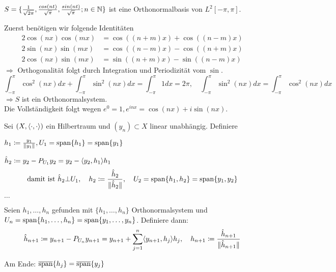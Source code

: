 \begin{beispiel}
	$S = \{ \frac{1}{\sqrt{2 \pi}}, \frac{cos(nt)}{\sqrt{\pi}}, \frac{sin(nt)}{\sqrt{\pi}}; n \in \mathbb{N} \}$ ist eine Orthonormalbasis von $L^{2}[-\pi, \pi]$.	
\end{beispiel}

\begin{beweis}
	Zuerst benötigen wir folgende Identitäten
	\begin{align*}
		2 \cos(nx) \cos(mx) & = \cos((n + m) x) + \cos( (n - m) x) \\
		2 \sin(nx) \sin(mx) & = \cos((n - m) x) - \cos( (n + m) x) \\
		2 \cos(nx) \sin(mx) & = \sin((n + m) x) - \sin( (n - m) x) 
	\end{align*}
	$\Rightarrow$ Orthogonalität folgt durch Integration und Periodizität vom $\sin$.
	\[ \int_{-\pi}^{\pi} \cos^{2}(nx) dx + \int_{-\pi}^{\pi} \sin^{2}(nx) dx = \int_{-\pi}^{\pi} 1 dx = 2 \pi, \quad \int_{-\pi}^{\pi} \sin^{2}(nx) dx = \int_{-\pi}^{\pi} \cos^{2}(nx) dx \]
	$\Rightarrow S$ ist ein Orthonormalsystem. \\
	Die Vollständigkeit folgt wegen $e^{0} = 1, e^{inx} = \cos(nx) + i \sin(nx)$.
\end{beweis}


\begin{anwendung} 
	Sei $(X, \langle \cdot, \cdot \rangle)$ ein Hilbertraum und $(y_{n}) \subset X$ linear unabhängig. Definiere
	\begin{description}
		\item $h_{1} \coloneqq \frac{y_{1}}{\| y_{1} \|}, U_{1} = \operatorname{span} \{ h_{1} \} = \operatorname{span} \{ y_{1} \}$
		\item $\hat{h}_{2} \coloneqq y_{2} - P_{U_{1}} y_{2} = y_{2} - \langle y_{2} , h_{1} \rangle h_{1}$
			\[ \text{damit ist } \hat{h}_{2} \bot U_{1}, \quad h_{2} \coloneqq \frac{\hat{h}_{2}}{\| \hat{h}_{2} \|}, \quad U_{2} = \operatorname{span} \{ h_{1}, h_{2} \} = \operatorname{span} \{ y_{1}, y_{2} \} \]
		\item $\dotsc$
		\item Seien $h_{1}, \dotsc, h_{n}$ gefunden mit $\{ h_{1}, \dotsc, h_{n} \}$ Orthonormalsystem und $U_{n} = \operatorname{span} \{ h_{1}, \dotsc, h_{n} \} = \operatorname{span} \{ y_{1}, \dotsc, y_{n} \}$. Definiere dann:
			\[ \hat{h}_{n + 1} \coloneqq y_{n + 1} - P_{U_{n}} y_{n + 1 } = y_{n + 1} + \sum_{j = 1}^{n} \langle y_{n + 1} , h_{j} \rangle h_{j}, \quad h_{n + 1} \coloneqq \frac{\hat{h}_{n + 1}}{\| \hat{h}_{n + 1} \|} \]
	\end{description}
	Am Ende: $\overline{\operatorname{span}}\{ h_{j} \} = \overline{\operatorname{span}}\{ y_{j} \}$
\end{anwendung}


